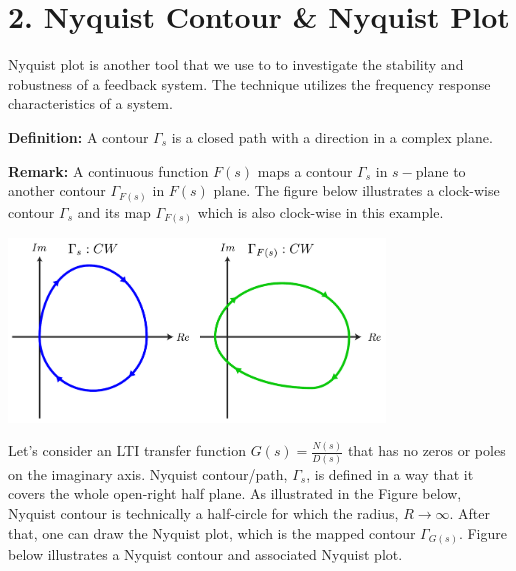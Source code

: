 \documentclass{article}
\begin{document}
\vspace{6 pt}

\section*{2. Nyquist Contour \& Nyquist Plot}

Nyquist plot is another tool that we use to to investigate 
the stability and robustness of a feedback system. The technique 
utilizes the frequency response characteristics of a system.

\textbf{Definition:} A contour $\Gamma_s$ is a closed path with a direction
in a complex plane. 

\textbf{Remark:} A continuous function $F(s)$ maps a contour
$\Gamma_s$ in $s-$plane to another contour $\Gamma_{F(s)}$
in $F(s)$ plane. The figure below illustrates a clock-wise contour 
$\Gamma_s$ and its map $\Gamma_{F(s)}$ which is also clock-wise
in this example. 

\vspace{6 pt}

  \begin{minipage}[h]{1\linewidth}
    \begin{center}
      \includegraphics[width=0.75\textwidth]{cmap}
    \end{center}
  \end{minipage}
  
\vspace{6 pt}

Let's consider an LTI transfer function $G(s) = \frac{N(s)}{D(s)}$ that 
has no zeros or poles on the imaginary axis. Nyquist contour/path, 
$\Gamma_s$, is defined in a way that it covers the
whole open-right half plane. As illustrated in the Figure below, 
Nyquist contour is technically a half-circle for which the radius, $R
\to \infty$. After that, one can draw the Nyquist plot, which is the
mapped contour $\Gamma_{G(s)}$. Figure below illustrates a Nyquist
contour and associated Nyquist plot. 

\vspace{6 pt}
\end{document}
